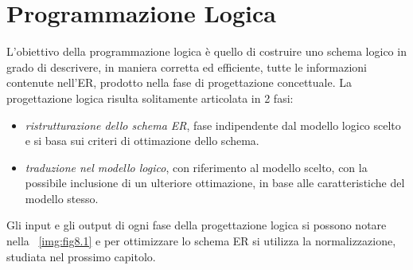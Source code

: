 \chapter{Programmazione Logica}
L'obiettivo della programmazione logica è quello di costruire uno schema logico in grado di descrivere, in maniera corretta ed
efficiente, tutte le informazioni contenute nell'ER, prodotto nella fase di progettazione concettuale.\newline
La progettazione logica risulta solitamente articolata in 2 fasi:
\begin{itemize}
        \item \emph{ristrutturazione dello schema ER}, fase indipendente dal modello logico scelto e si basa sui criteri di 
              ottimazione dello schema.
        \item \emph{traduzione nel modello logico}, con riferimento al modello scelto, con la possibile inclusione di un
              ulteriore ottimazione, in base alle caratteristiche del modello stesso.
\end{itemize}
Gli input e gli output di ogni fase della progettazione logica si possono notare nella \figurename~\ref{img:fig8.1} e
per ottimizzare lo schema ER si utilizza la normalizzazione, studiata nel prossimo capitolo.

